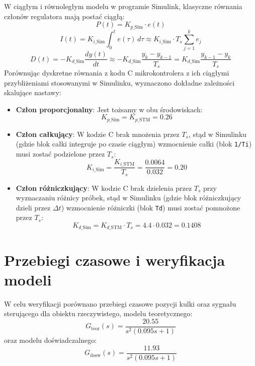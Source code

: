 W ciągłym i równoległym modelu w programie Simulink, klasyczne równania
członów regulatora mają postać ciągłą:
\begin{equation}
    P(t) = K_{p\text{\_Sim}} \cdot e(t)
\end{equation}
\begin{equation}
    I(t) = K_{i\text{\_Sim}} \int_{0}^{t} e(\tau) \, d\tau \approx K_{i\text{\_Sim}} \cdot T_s \sum_{j=1}^{k} e_j
\end{equation}
\begin{equation}
    D(t) = -K_{d\text{\_Sim}} \frac{dy(t)}{dt} \approx -K_{d\text{\_Sim}} \frac{y_k - y_{k-1}}{T_s} = K_{d\text{\_Sim}} \frac{y_{k-1} - y_k}{T_s}
\end{equation}
Porównując dyskretne równania z kodu C mikrokontrolera z ich ciągłymi
przybliżeniami stosowanymi w Simulinku, wyznaczono dokładne zależności
skalujące nastawy:
\begin{itemize}
    \item \textbf{Człon proporcjonalny}: Jest tożsamy w obu środowiskach:
    \begin{equation}
        K_{p\text{\_Sim}} = K_{p\text{\_STM}} = 0.26
    \end{equation}
    \item \textbf{Człon całkujący}: W kodzie C brak mnożenia przez $T_s$,
    stąd w Simulinku (gdzie blok całki integruje po czasie ciągłym) wzmocnienie
    całki (blok \texttt{1/Ti}) musi zostać podzielone przez $T_s$:
    \begin{equation}
        K_{i\text{\_Sim}} = \frac{K_{i\text{\_STM}}}{T_s} = \frac{0.0064}{0.032} = 0.20
    \end{equation}
    \item \textbf{Człon różniczkujący}: W kodzie C brak dzielenia przez $T_s$
    przy wyznaczaniu różnicy próbek, stąd w Simulinku (gdzie blok
    różniczkujący dzieli przez $\Delta t$) wzmocnienie różniczki (blok
    \texttt{Td}) musi zostać pomnożone przez $T_s$:
    \begin{equation}
        K_{d\text{\_Sim}} = K_{d\text{\_STM}} \cdot T_s = 4.4 \cdot 0.032 = 0.1408
    \end{equation}
\end{itemize}

\section{Przebiegi czasowe i weryfikacja modeli}
\label{sec:przebiegi}

W celu weryfikacji porównano przebiegi czasowe pozycji kulki oraz sygnału
sterującego dla obiektu rzeczywistego, modelu teoretycznego:
\begin{equation}
    G_{\text{teor}}(s) = \frac{20.55}{s^2(0.095s + 1)}
\end{equation}
oraz modelu doświadczalnego:
\begin{equation}
    G_{\text{dosw}}(s) = \frac{11.93}{s^2(0.095s + 1)}
\end{equation}

